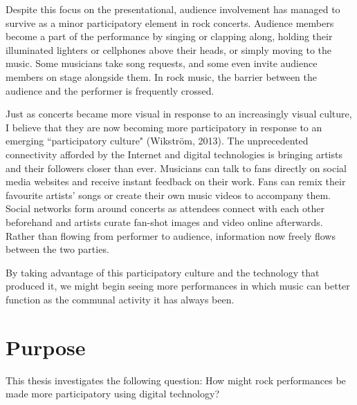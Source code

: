 Despite this focus on the presentational, audience involvement has managed to survive as a minor participatory element in rock concerts. Audience members become a part of the performance by singing or clapping along, holding their illuminated lighters or cellphones above their heads, or simply moving to the music. Some musicians take song requests, and some even invite audience members on stage alongside them. In rock music, the barrier between the audience and the performer is frequently crossed.

Just as concerts became more visual in response to an increasingly visual culture, I believe that they are now becoming more participatory in response to an emerging ``participatory culture" (Wikstr\"{o}m, 2013). The unprecedented connectivity afforded by the Internet and digital technologies is bringing artists and their followers closer than ever. Musicians can talk to fans directly on social media websites and receive instant feedback on their work. Fans can remix their favourite artists' songs or create their own music videos to accompany them. Social networks form around concerts as attendees connect with each other beforehand and artists curate fan-shot images and video online afterwards. Rather than flowing from performer to audience, information now freely flows between the two parties.


By taking advantage of this participatory culture and the technology that produced it, we might begin seeing more performances in which music can better function as the communal activity it has always been.


\section{Purpose}

This thesis investigates the following question: How might rock performances be made more participatory using digital technology? 

